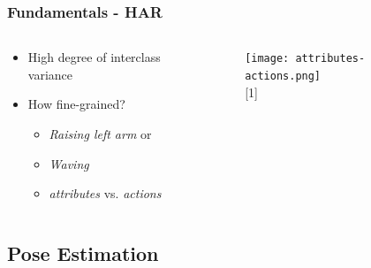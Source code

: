 \documentclass[9pt]{beamer}
\providecommand{\sourcefix}[1]{\\ \footnotesize \tugreen{Source:} [#1]}
\newenvironment{myframe}[1][]{%
\begin{frame}%
\frametitle{#1}
\setcounter{footnote}{0}


}{%
\end{frame}%
}
\begin{document}
\begin{myframe}[Fundamentals - HAR]
    \begin{columns}
        \begin{column}{.48\linewidth}
            \begin{itemize}
                \item High degree of interclass variance
                \item How fine-grained?
                \begin{itemize}
                    \item \textit{Raising left arm} or
                    \item \textit{Waving}
                    \item \textit{attributes} vs. \textit{actions} \footnotemark
                \end{itemize}
            \end{itemize}
        \end{column}
        \begin{column}{.48\linewidth}
            \begin{figure}
                \texttt{[image: attributes-actions.png]}
                \sourcefix{1}
            \end{figure}
        \end{column}
    \end{columns}
\end{myframe}

\subsection{Pose Estimation}
\end{document}
